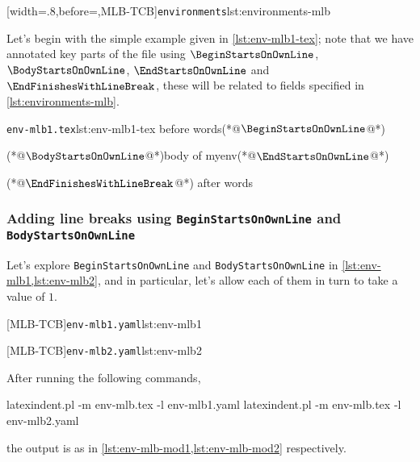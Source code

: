 	[width=.8\linewidth,before=\centering,MLB-TCB]{\texttt{environments}}{lst:environments-mlb}

	Let's begin with the simple example given in \cref{lst:env-mlb1-tex}; note that we have annotated key parts of the file using $\BeginStartsOnOwnLine$, $\BodyStartsOnOwnLine$, $\EndStartsOnOwnLine$ and $\EndFinishesWithLineBreak$, these will be related to fields specified in \cref{lst:environments-mlb}.

	\begin{cmhlistings}[escapeinside={(*@}{@*)}]{\texttt{env-mlb1.tex}}{lst:env-mlb1-tex}
before words(*@$\BeginStartsOnOwnLine$@*) \begin{myenv}(*@$\BodyStartsOnOwnLine$@*)body of myenv(*@$\EndStartsOnOwnLine$@*)\end{myenv}(*@$\EndFinishesWithLineBreak$@*) after words
\end{cmhlistings}

\subsubsection{Adding line breaks using \texttt{BeginStartsOnOwnLine} and \texttt{BodyStartsOnOwnLine}}
	Let's explore \texttt{BeginStartsOnOwnLine} and \texttt{BodyStartsOnOwnLine} in \cref{lst:env-mlb1,lst:env-mlb2}, and in particular, let's allow each of them in turn to take a value of $1$.

	\begin{minipage}{.45\textwidth}
		[MLB-TCB]{\texttt{env-mlb1.yaml}}{lst:env-mlb1}
	\end{minipage}
	\hfill
	\begin{minipage}{.45\textwidth}
		[MLB-TCB]{\texttt{env-mlb2.yaml}}{lst:env-mlb2}
	\end{minipage}

	After running the following commands, \begin{commandshell}
latexindent.pl -m env-mlb.tex -l env-mlb1.yaml
latexindent.pl -m env-mlb.tex -l env-mlb2.yaml
\end{commandshell} the output is as in \cref{lst:env-mlb-mod1,lst:env-mlb-mod2} respectively.

	\begin{widepage}
		\begin{minipage}{.56\linewidth}
		\end{minipage}
		\hfill
		\begin{minipage}{.43\linewidth}
		\end{minipage}
	\end{widepage}

